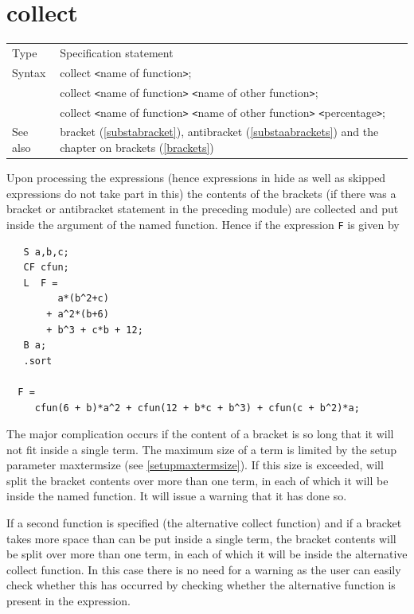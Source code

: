 
\section{collect}
\label{substacollect}

\noindent \begin{tabular}{ll}
Type & Specification statement\\
Syntax & collect {\tt<}name of function{\tt>}; \\
       & collect {\tt<}name of function{\tt>} 
        {\tt<}name of other function{\tt>}; \\
       & collect {\tt<}name of function{\tt>} 
        {\tt<}name of other function{\tt>} {\tt<}percentage{\tt>};
\\ See also & bracket (\ref{substabracket}), antibracket 
     (\ref{substaabrackets}) and the chapter on brackets 
     (\ref{brackets})
\end{tabular} \vspace{4mm}

\noindent Upon processing the expressions (hence expressions 
in hide as well as skipped expressions do not take part in this) the 
contents of the brackets (if there was a bracket or 
antibracket statement in the preceding module) are 
collected and put inside the argument of the named function. Hence if the 
expression \verb:F: is given by
\begin{verbatim}
   S a,b,c;
   CF cfun;
   L  F =
         a*(b^2+c)
       + a^2*(b+6)
       + b^3 + c*b + 12;
   B a;
   .sort

  F =
     cfun(6 + b)*a^2 + cfun(12 + b*c + b^3) + cfun(c + b^2)*a;
\end{verbatim}
The major complication occurs if the content of a 
bracket is so long that it will not fit inside a single term. The maximum 
size of a term is limited by the setup parameter 
maxtermsize (see \ref{setupmaxtermsize}). If this size 
is exceeded, {\FORM} will split the bracket contents over more than one term, 
in each of which it will be inside the named function. It will issue a 
warning that it has done so. \vspace{4mm}

\noindent If a second function is specified (the 
alternative collect function) and if a bracket takes 
more space than can be put inside a single term, the bracket contents will 
be split over more than one term, in each of which it will be inside the 
alternative collect function. In this case there is no need for a 
warning 
as the user can easily check whether this has occurred by checking whether 
the alternative function is present in the expression. \vspace{4mm}


